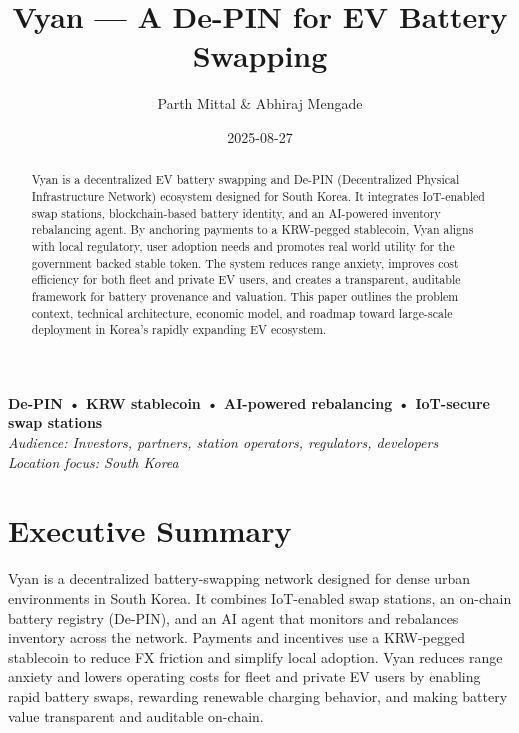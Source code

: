 \documentclass[12pt,a4paper]{article}
\title{\textbf{Vyan — A De-PIN for EV Battery Swapping}}
\author{Parth Mittal & Abhiraj Mengade}
\date{2025-08-27}
\begin{document}
\maketitle
\thispagestyle{empty}

\begin{center}
\textbf{De-PIN • KRW stablecoin • AI-powered rebalancing • IoT-secure swap stations} \\
\vspace{1cm}
\textit{Audience: Investors, partners, station operators, regulators, developers} \\
\textit{Location focus: South Korea}
\end{center}

\maketitle
\thispagestyle{empty}

\begin{abstract}
Vyan is a decentralized EV battery swapping and De-PIN (Decentralized Physical Infrastructure Network) ecosystem designed for South Korea. 
It integrates IoT-enabled swap stations, blockchain-based battery identity, and an AI-powered inventory rebalancing agent. 
By anchoring payments to a KRW-pegged stablecoin, Vyan aligns with local regulatory, user adoption needs and promotes real world utility for the government backed stable token.
The system reduces range anxiety, improves cost efficiency for both fleet and private EV users, and creates a transparent, auditable framework for battery provenance and valuation. 
This paper outlines the problem context, technical architecture, economic model, and roadmap toward large-scale deployment in Korea’s rapidly expanding EV ecosystem.
\end{abstract}

\newpage
\tableofcontents
\newpage

\section{Executive Summary}
Vyan is a decentralized battery-swapping network designed for dense urban environments in South Korea. It combines IoT-enabled swap stations, an on-chain battery registry (De-PIN), and an AI agent that monitors and rebalances inventory across the network. Payments and incentives use a KRW-pegged stablecoin to reduce FX friction and simplify local adoption. Vyan reduces range anxiety and lowers operating costs for fleet and private EV users by enabling rapid battery swaps, rewarding renewable charging behavior, and making battery value transparent and auditable on-chain.
\end{document}
